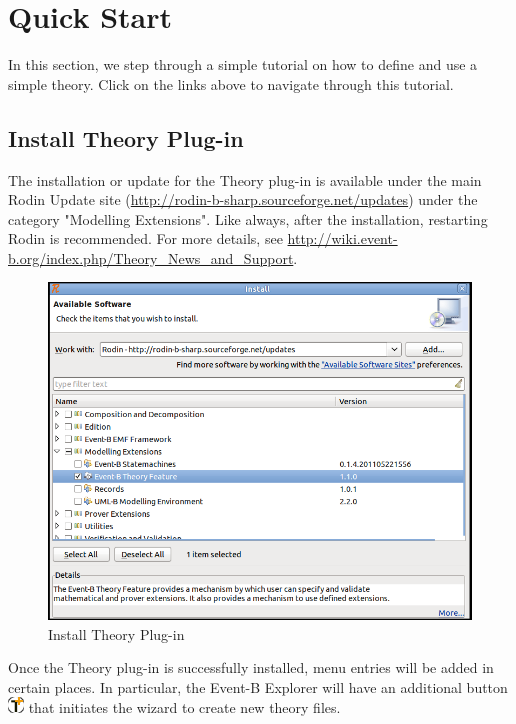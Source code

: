 \section{Quick Start}\label{quickStart}
In this section, we step through a simple tutorial on how to define and use a simple theory.
Click on the links above to navigate through this tutorial.
\subsection{Install Theory Plug-in}
The installation or update for the Theory plug-in is available under the main Rodin Update site (\url{http://rodin-b-sharp.sourceforge.net/updates}) under the category "Modelling Extensions". Like always, after the installation, restarting Rodin is recommended. For more details, see \url{http://wiki.event-b.org/index.php/Theory_News_and_Support}.

\begin{center}
\begin{figure}
\label{newTFW}
\includegraphics{images/InstallTheory.png}
\caption{Install Theory Plug-in}
\end{figure}
\end{center}

Once the Theory plug-in is successfully installed, menu entries will be added in certain places. In particular, the Event-B Explorer will have an additional button \includegraphics{images/newThy.png} that initiates the wizard to create new theory files.

